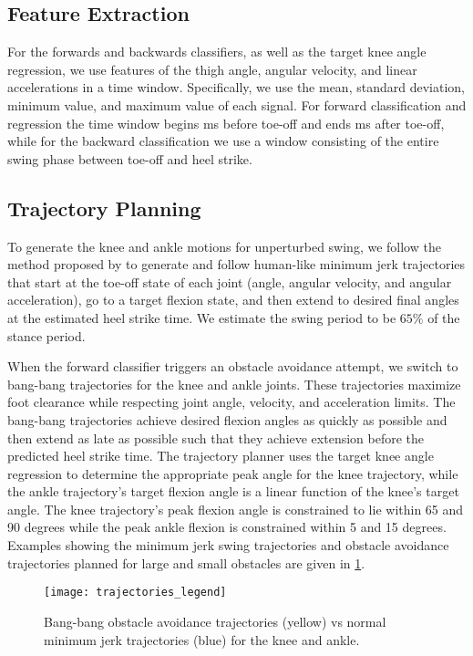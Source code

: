 \subsection{Feature Extraction}
For the forwards and backwards classifiers, as well as the target knee angle
regression, we use features of the thigh angle, angular velocity, and linear
accelerations in a time window. Specifically, we use the mean, standard
deviation, minimum value, and maximum value of each signal. For forward
classification and regression the time window begins \unit[210]{ms} before
toe-off and ends \unit[90]{ms} after toe-off, while for the backward
classification we use a window consisting of the entire swing phase between
toe-off and heel strike.

\subsection{Trajectory Planning}

To generate the knee and ankle motions for unperturbed swing, we follow the
method proposed by \citet{lenzi2014speed} to generate and follow human-like
minimum jerk trajectories that start at the toe-off state of each joint (angle,
angular velocity, and angular acceleration), go to a target flexion state, and
then extend to desired final angles at the estimated heel strike time. We
estimate the swing period to be $65\%$ of the stance period.

When the forward classifier triggers an obstacle avoidance attempt, we switch to
bang-bang trajectories for the knee and ankle joints. These trajectories
maximize foot clearance while respecting joint angle, velocity, and acceleration
limits. The bang-bang trajectories achieve desired flexion angles as quickly as
possible and then extend as late as possible such that they achieve extension
before the predicted heel strike time. The trajectory planner uses the target
knee angle regression to determine the appropriate peak angle for the knee
trajectory, while the ankle trajectory's target flexion angle is a linear
function of the knee's target angle. The knee trajectory's peak flexion angle is
constrained to lie within 65 and 90 degrees while the peak ankle flexion is
constrained within 5 and 15 degrees. Examples showing the minimum jerk swing
trajectories and obstacle avoidance trajectories planned for large and small
obstacles are given in \cref{fig:avoid_trajs}.

\begin{figure}[tb]
\centerline{\texttt{[image: trajectories\_legend]}}
\caption{Bang-bang obstacle avoidance trajectories (yellow) vs normal minimum
jerk trajectories (blue) for the knee and ankle.}\label{fig:avoid_trajs}
\end{figure}

